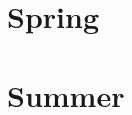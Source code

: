 \documentclass[11pt,twoside]{book}
\begin{document}
\chapter{Spring}
\lipsum[1-6]
\chapter{Summer}
\lipsum[7-12]
\end{document}
